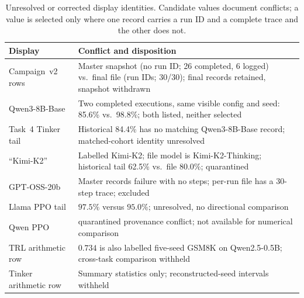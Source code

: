\begin{table}[htbp]
\centering\small
\caption{Unresolved or corrected display identities. Candidate values document
conflicts; a value is selected only where one record carries a run ID and a
complete trace and the other does not.}
\label{tab:identity-conflicts}
\begin{tabular}{p{.25\linewidth}p{.64\linewidth}}
\toprule
Display & Conflict and disposition \\
\midrule
Campaign~v2 rows & Master snapshot (no run ID; 26 completed, 6 logged) vs.\ final file (run IDs; 30/30); final records retained, snapshot withdrawn \\
Qwen3-8B-Base & Two completed executions, same visible config and seed: 85.6\% vs.\ 98.8\%; both listed, neither selected \\
Task~4 Tinker tail & Historical 84.4\% has no matching Qwen3-8B-Base record; matched-cohort identity unresolved \\
``Kimi-K2'' & Labelled Kimi-K2; file model is Kimi-K2-Thinking; historical tail 62.5\% vs.\ file 80.0\%; quarantined \\
GPT-OSS-20b & Master records failure with no steps; per-run file has a 30-step trace; excluded \\
Llama PPO tail & $97.5\%$ versus $95.0\%$; unresolved, no directional comparison \\
Qwen PPO & quarantined provenance conflict; not available for numerical comparison \\
TRL arithmetic row & $0.734$ is also labelled five-seed GSM8K on Qwen2.5-0.5B; cross-task comparison withheld \\
Tinker arithmetic row & Summary statistics only; reconstructed-seed intervals withheld \\
\bottomrule
\end{tabular}
\end{table}
